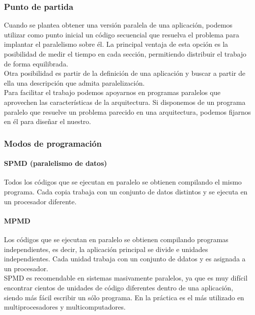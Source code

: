 \documentclass[12pt,spanish]{article}
\begin{document}
\subsubsection{Punto de partida}

Cuando se plantea obtener una versión paralela de una aplicación, podemos utilizar como punto inicial un código secuencial que resuelva el problema para implantar el paralelismo sobre él. La principal ventaja de esta opción es la posibilidad de medir el tiempo en cada sección, permitiendo distribuir el trabajo de forma equilibrada.\\

Otra posibilidad es partir de la definición de una aplicación y buscar a partir de ella una descripción que admita paralelización.\\

Para facilitar el trabajo podemos apoyarnos en programas paralelos que aprovechen las características de la arquitectura. Si disponemos de un programa paralelo que resuelve un problema parecido en una arquitectura, podemos fijarnos en él para diseñar el nuestro.

\subsubsection{Modos de programación}

\paragraph{SPMD (paralelismo de datos)}
Todos los códigos que se ejecutan en paralelo se obtienen compilando el mismo programa. Cada copia trabaja con un conjunto de datos distintos y se ejecuta en un procesador diferente.

\paragraph{MPMD} 
Los códigos que se ejecutan en paralelo se obtienen compilando programas independientes, es decir, la aplicación principal se divide e unidades independientes. Cada unidad trabaja con un conjunto de ddatos y es asignada a un procesador.\\

SPMD es recomendable en sistemas masivamente paralelos, ya que es muy difícil encontrar cientos de unidades de código diferentes dentro de una aplicación, siendo más fácil escribir un sólo programa. En la práctica es el más utilizado en multiprocesadores y multicomputadores.
\end{document}
